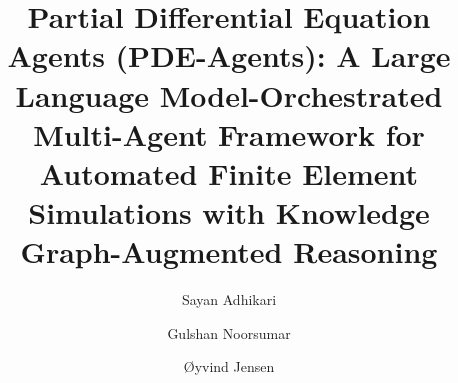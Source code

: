 \documentclass[preprint,review,12pt]{elsarticle}
\begin{document}
\begin{frontmatter}

\title{Partial Differential Equation Agents (PDE-Agents):
       A Large Language Model-Orchestrated Multi-Agent
       Framework for Automated Finite Element Simulations
       with Knowledge Graph-Augmented Reasoning}

\author[ife]{Sayan Adhikari}
\author[ife]{Gulshan Noorsumar}
\author[ife]{\O yvind Jensen}




\end{frontmatter}
\end{document}
